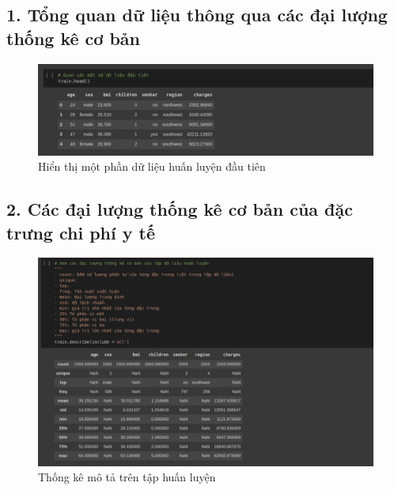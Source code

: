 \documentclass{article}
\begin{document}
	\subsection{1. Tổng quan dữ liệu thông qua các đại lượng thống kê cơ bản}
	\begin{figure}[H]
		\centering
		\includegraphics[width=1\textwidth]{images/train_head.png}
		\caption{Hiển thị một phần dữ liệu huấn luyện đầu tiên}
		\label{fig:writing-thesis}
	\end{figure}
	
	\subsection{2. Các đại lượng thống kê cơ bản của đặc trưng chi phí y tế}
	\begin{figure}[H]
		\centering
		\includegraphics[width=1\textwidth]{images/simple_stat_on_train_set.png}
		\caption{Thống kê mô tả trên tập huấn luyện}
		\label{fig:writing-thesis}
	\end{figure}
\end{document}
